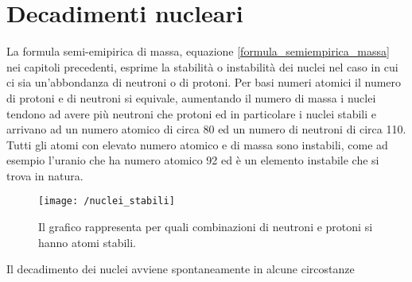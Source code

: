 
\section{Decadimenti nucleari}
La formula semi-emipirica di massa, equazione \ref{formula_semiempirica_massa} nei capitoli precedenti, esprime la stabilità o instabilità dei nuclei nel caso in cui ci sia un'abbondanza di neutroni o di protoni.
Per basi numeri atomici il numero di protoni e di neutroni si equivale, aumentando il numero di massa i nuclei tendono ad avere più neutroni che protoni ed in particolare i nuclei stabili e arrivano ad un numero atomico di circa 80 ed un numero di neutroni di circa 110.
Tutti gli atomi con elevato numero atomico e di massa sono instabili, come ad esempio l'uranio che ha numero atomico 92 ed è un elemento instabile che si trova in natura.
\begin{figure}[h]
\centering
\texttt{[image: /nuclei\_stabili]}
\caption{Il grafico rappresenta per quali combinazioni di neutroni e protoni si hanno atomi stabili.}
\end{figure}
Il decadimento dei nuclei avviene spontaneamente in alcune circostanze

